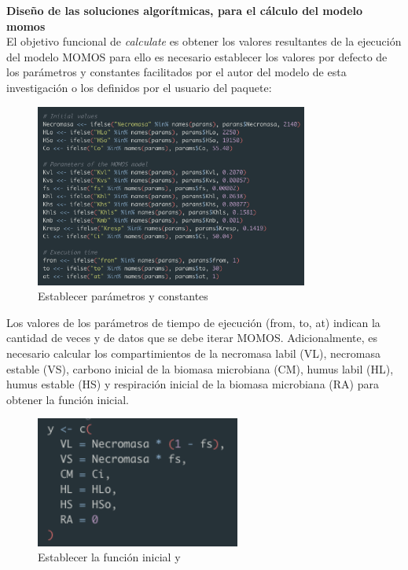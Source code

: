 \noindent
\textbf{Diseño de las soluciones algor\'itmicas, para el c\'alculo del modelo momos}\\

El objetivo funcional de \textit{calculate} es obtener los valores resultantes de la ejecuci\'on del modelo MOMOS para ello es necesario establecer los valores por defecto de los par\'ametros y constantes facilitados por el autor del modelo de esta investigaci\'on o los definidos por el usuario del paquete:

\begin{figure}[H]
  \centering
    \begin{minipage}{0.8\textwidth}
      \centering
      \includegraphics[width=0.8\textwidth]{figure_4_9.png}
      \caption{Establecer par\'ametros y constantes}
      \label{fig:Fig}
    \end{minipage}%
    \hspace{5mm}
\end{figure}

Los valores de los par\'ametros de tiempo de ejecuci\'on (from, to, at) indican la cantidad de veces y de datos que se debe iterar MOMOS. Adicionalmente, es necesario calcular los compartimientos de la necromasa labil (VL), necromasa estable (VS), carbono inicial de la biomasa microbiana (CM), humus labil (HL), humus estable (HS) y respiraci\'on inicial de la biomasa microbiana (RA) para obtener la funci\'on inicial.\\

\begin{figure}[H]
  \centering
    \begin{minipage}{0.6\textwidth}
      \centering
      \includegraphics[width=0.6\textwidth]{figure_4_10.png}
      \caption{Establecer la funci\'on inicial y}
      \label{fig:Fig}
    \end{minipage}%
    \hspace{5mm}
\end{figure}


